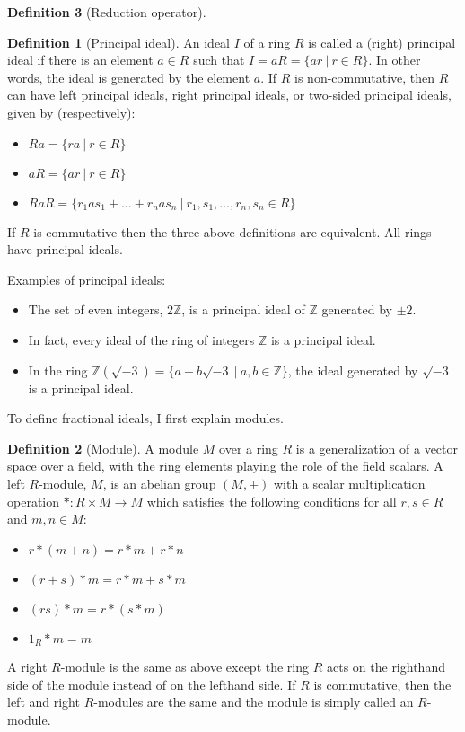 \documentclass{article}
\theoremstyle{definition}
\newtheorem{definition}{Definition}[section]
\theoremstyle{theorem}
\theoremstyle{example}
\theoremstyle{corollary}
\begin{document}
\begin{definition}[Reduction operator]
\bigskip

\theoremstyle{definition}
\begin{definition}[Principal ideal]
An ideal \(I\) of a ring \(R\) is called a (right) principal ideal if there is an element \(a \in R\) such that \(I = aR = \{ ar \ | \ r \in R \}\). In other words, the ideal is generated by the element \(a\)\). If \(R\) is non-commutative, then \(R\) can have left principal ideals, right principal ideals, or two-sided principal ideals, given by (respectively):
\begin{itemize}
\item \(Ra = \{ ra \ | \ r \in R \} \)
\item \(aR = \{ ar \ | \ r \in R \} \)
\item \(RaR = \{ r_{1} a s_{1} + . . . + r_{n} a s_{n} \ | \ r_{1}, s_{1}, . . . , r_{n}, s_{n} \in R \} \)
\end{itemize}
If \(R\) is commutative then the three above definitions are equivalent. All rings have principal ideals.
\end{definition}

\bigskip

Examples of principal ideals:
\begin{itemize}
\item The set of even integers, \(2\mathbb{Z}\), is a principal ideal of \(\mathbb{Z}\) generated by \(\pm 2\).
\item In fact, every ideal of the ring of integers \(\mathbb{Z}\) is a principal ideal.
\item In the ring \(\mathbb{Z}(\sqrt{-3}) = \{ a + b \sqrt{-3} \ | \ a,b \in \mathbb{Z} \} \), the ideal generated by \(\sqrt{-3}\) is a principal ideal.
\end{itemize}

\bigskip

To define fractional ideals, I first explain modules.

\bigskip

\theoremstyle{definition}
\begin{definition}[Module]
A module \(M\) over a ring \(R\) is a generalization of a vector space over a field, with the ring elements playing the role of the field scalars. A left \(R\)-module, \(M\), is an abelian group \((M, +)\) with a scalar multiplication operation \(* : R \times M \rightarrow M\) which satisfies the following conditions for all \(r, s \in R\) and \(m, n \in M\):
\begin{itemize}
\item \(r * (m + n) = r * m + r * n\)
\item \((r + s) * m = r * m + s * m\)
\item \((rs) * m = r * (s * m)\)
\item \(1_{R} * m = m\)
\end{itemize}
A right \(R\)-module is the same as above except the ring \(R\) acts on the righthand side of the module instead of on the lefthand side. If \(R\) is commutative, then the left and right \(R\)-modules are the same and the module is simply called an \(R\)-module.
\end{definition}


\end{definition}
\end{document}
